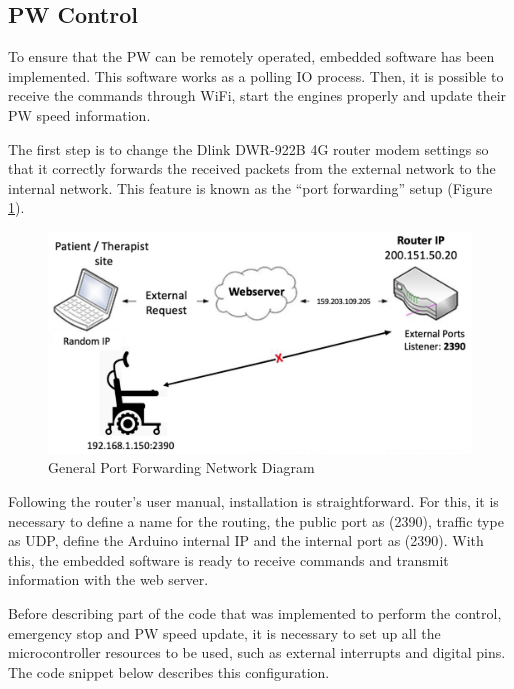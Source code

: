 \subsection{PW Control}
\label{sec:pwControl}

To ensure that the PW can be remotely operated, embedded software has been implemented. This software works as a polling IO process. Then, it is possible to receive the commands through WiFi, start the engines properly and update their PW speed information.

The first step is to change the Dlink DWR-922B 4G router modem settings so that it correctly forwards the received packets from the external network to the internal network. This feature is known as the ``port forwarding'' setup (Figure \ref{fig:pfnDiagram}).

\begin{figure}[!hbt]
\begin{center}
\includegraphics[width=0.8\linewidth]{img/cap5/pfnDiagram2}
\caption{General Port Forwarding Network Diagram} \label{fig:pfnDiagram}
\end{center}
\end{figure}

Following the router's user manual, installation is straightforward. For this, it is necessary to define a name for the routing, the public port as (2390), traffic type as UDP, define the Arduino internal IP and the internal port as (2390). With this, the embedded software is ready to receive commands and transmit information with the web server. 

Before describing part of the code that was implemented to perform the control, emergency stop and PW speed update, it is necessary to set up all the microcontroller resources to be used, such as external interrupts and digital pins. The code snippet below describes this configuration.\newline

